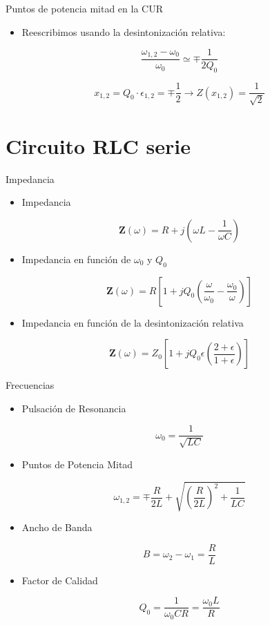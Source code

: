 \documentclass[xcolor={usenames,svgnames,dvipsnames}]{beamer}
\newcommand{\fasor}[1]{\mathbf{#1}(\omega)}
\begin{document}
\begin{frame}[label={sec:orgb149261}]{Puntos de potencia mitad en la CUR}
\begin{itemize}
\item Reescribimos usando la desintonización relativa:
\end{itemize}
\[
  \frac{\omega_{1,2} - \omega_0}{\omega_0} \simeq \mp \frac{1}{2Q_0}
\]

\[
  \boxed{x_{1,2} = Q_0 \cdot \epsilon_{1,2} = \mp \frac{1}{2}} \rightarrow Z(x_{1,2}) = \frac{1}{\sqrt{2}}
\]
\end{frame}

\section{Circuito RLC serie}
\label{sec:orgef2f765}
\begin{frame}[label={sec:org59d199e}]{Impedancia}
\begin{itemize}
\item Impedancia
\end{itemize}
\[
  \fasor{Z} = R + j(\omega L - \frac{1}{\omega C})
\]
\begin{itemize}
\item Impedancia en función de \(\omega_0\) y \(Q_0\)
\end{itemize}
\[
  \fasor{Z} = R \left[1 + j Q_0 \left(\frac{\omega}{\omega_0} - \frac{\omega_0}{\omega}\right)\right]
\]

\begin{itemize}
\item Impedancia en función de la desintonización relativa
\end{itemize}
\[
  \fasor{Z} = Z_0 \left[ 1 + j Q_0 \epsilon\left(\frac{2 + \epsilon}{1 + \epsilon}\right)\right]
\]  
\end{frame}

\begin{frame}[label={sec:orgd22ea5c}]{Frecuencias}
\begin{itemize}
\item Pulsación de Resonancia
\end{itemize}
\[
  \omega_0 = \frac{1}{\sqrt{LC}}
\]
\begin{itemize}
\item Puntos de Potencia Mitad
\end{itemize}
\[
\omega_{1,2}= \mp \frac{R}{2L} + \sqrt{\left(\frac{R}{2L}\right)^2 + \frac{1}{LC}}
\]

\begin{itemize}
\item Ancho de Banda
\end{itemize}
\[
B = \omega_2 - \omega_1 = \frac{R}{L}
\]

\begin{itemize}
\item Factor de Calidad
\end{itemize}
\[
  Q_0 = \frac{1}{\omega_0 C R} = \frac{\omega_0 L}{R}
\]
\end{frame}
\end{document}
